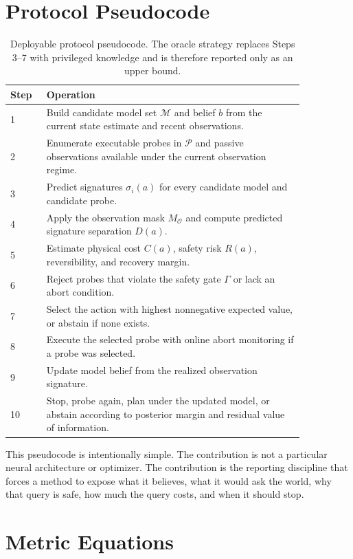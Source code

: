 \documentclass{article}
\newcommand{\modelset}{\mathcal{M}}
\newcommand{\obs}{\mathcal{O}}
\begin{document}
\section{Protocol Pseudocode}

\begin{table}[p]
\centering
\small
\begin{tabular}{p{0.10\linewidth}p{0.75\linewidth}}
\toprule
Step & Operation \\
\midrule
1 & Build candidate model set $\modelset$ and belief $b$ from the current state estimate and recent observations. \\
2 & Enumerate executable probes in $\mathcal{P}$ and passive observations available under the current observation regime. \\
3 & Predict signatures $\sigma_i(a)$ for every candidate model and candidate probe. \\
4 & Apply the observation mask $M_{\obs}$ and compute predicted signature separation $D(a)$. \\
5 & Estimate physical cost $C(a)$, safety risk $R(a)$, reversibility, and recovery margin. \\
6 & Reject probes that violate the safety gate $\Gamma$ or lack an abort condition. \\
7 & Select the action with highest nonnegative expected value, or abstain if none exists. \\
8 & Execute the selected probe with online abort monitoring if a probe was selected. \\
9 & Update model belief from the realized observation signature. \\
10 & Stop, probe again, plan under the updated model, or abstain according to posterior margin and residual value of information. \\
\bottomrule
\end{tabular}
\caption{Deployable protocol pseudocode. The oracle strategy replaces Steps 3--7 with privileged knowledge and is therefore reported only as an upper bound.}
\label{tab:pseudocode}
\end{table}

This pseudocode is intentionally simple. The contribution is not a particular neural architecture or optimizer. The contribution is the reporting discipline that forces a method to expose what it believes, what it would ask the world, why that query is safe, how much the query costs, and when it should stop.

\section{Metric Equations}
\end{document}
